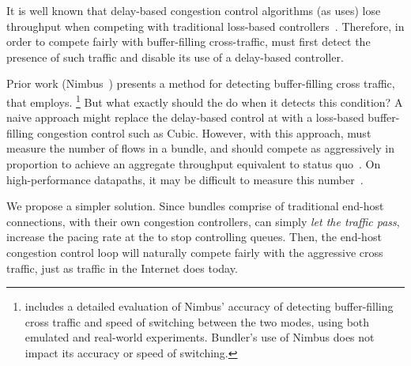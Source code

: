 
It is well known that delay-based congestion control algorithms (as \name uses) lose throughput when competing with traditional loss-based controllers~\cite{copa}. Therefore, in order to compete fairly with buffer-filling cross-traffic, \name must first detect the presence of such traffic and disable its use of a delay-based controller.  

Prior work (Nimbus~\cite{nimbus-arxiv}) presents a method for detecting buffer-filling cross traffic, that \name employs.
\footnote{\cite{nimbus-arxiv} includes a detailed evaluation of Nimbus' accuracy of detecting buffer-filling cross traffic and speed of switching between the two modes, using both emulated and real-world experiments. Bundler's use of Nimbus does not impact its accuracy or speed of switching.}
But what exactly should the \inbox do when it detects this condition?
A naive approach might replace the delay-based control at \name with a loss-based buffer-filling congestion control such as Cubic. 
However, with this approach, \name must measure the number of flows in a bundle, and should compete as aggressively in proportion to achieve an aggregate throughput equivalent to status quo~\cite{multcp}. On high-performance datapaths, it may be difficult to measure this number~\cite{heavy-hitters}.

We propose a simpler solution.
Since bundles comprise of traditional end-host connections, with their own congestion controllers, \name can simply \emph{let the traffic pass}, \ie increase the pacing rate at the \inbox to stop controlling queues. Then, the end-host congestion control loop will naturally compete fairly with the aggressive cross traffic, just as traffic in the Internet does today.

